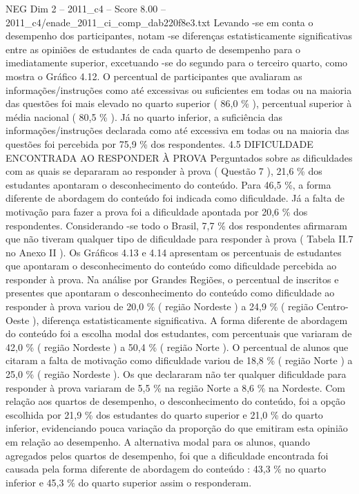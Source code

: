 \begin{textsample}{NEG Dim 2 – 2011\_c4 – Score 8.00 – 2011\_c4/enade\_2011\_ci\_comp\_dab220f8e3.txt}
Levando -se em conta o desempenho dos participantes, notam -se diferenças estatisticamente significativas entre as opiniões de estudantes de cada quarto de desempenho para o imediatamente superior, excetuando -se do segundo para o terceiro quarto, como mostra o Gráfico 4.12.
O percentual de participantes que avaliaram as informações/instruções como até excessivas ou suficientes em todas ou na maioria das questões foi mais elevado no quarto superior ( 86,0 \% ), percentual superior à média nacional ( 80,5 \% ).
Já no quarto inferior, a suficiência das informações/instruções declarada como até excessiva em todas ou na maioria das questões foi percebida por 75,9 \% dos respondentes. 4.5 DIFICULDADE ENCONTRADA AO RESPONDER À PROVA Perguntados sobre as dificuldades com as quais se depararam ao responder à prova ( Questão 7 ), 21,6 \% dos estudantes apontaram o desconhecimento do conteúdo.
Para 46,5 \%, a forma diferente de abordagem do conteúdo foi indicada como dificuldade.
Já a falta de motivação para fazer a prova foi a dificuldade apontada por 20,6 \% dos respondentes.
Considerando -se todo o Brasil, 7,7 \% dos respondentes afirmaram que não tiveram qualquer tipo de dificuldade para responder à prova ( Tabela II.7 no Anexo II ).
Os Gráficos 4.13 e 4.14 apresentam os percentuais de estudantes que apontaram o desconhecimento do conteúdo como dificuldade percebida ao responder à prova.
Na análise por Grandes Regiões, o percentual de inscritos e presentes que apontaram o desconhecimento do conteúdo como dificuldade ao responder à prova variou de 20,0 \% ( região Nordeste ) a 24,9 \% ( região Centro-Oeste ), diferença estatisticamente significativa.
A forma diferente de abordagem do conteúdo foi a escolha modal dos estudantes, com percentuais que variaram de 42,0 \% ( região Nordeste ) a 50,4 \% ( região Norte ).
O percentual de alunos que citaram a falta de motivação como dificuldade variou de 18,8 \% ( região Norte ) a 25,0 \% ( região Nordeste ).
Os que declararam não ter qualquer dificuldade para responder à prova variaram de 5,5 \% na região Norte a 8,6 \% na Nordeste.
Com relação aos quartos de desempenho, o desconhecimento do conteúdo, foi a opção escolhida por 21,9 \% dos estudantes do quarto superior e 21,0 \% do quarto inferior, evidenciando pouca variação da proporção do que emitiram esta opinião em relação ao desempenho.
A alternativa modal para os alunos, quando agregados pelos quartos de desempenho, foi que a dificuldade encontrada foi causada pela forma diferente de abordagem do conteúdo : 43,3 \% no quarto inferior e 45,3 \% do quarto superior assim o responderam.

\end{textsample}
